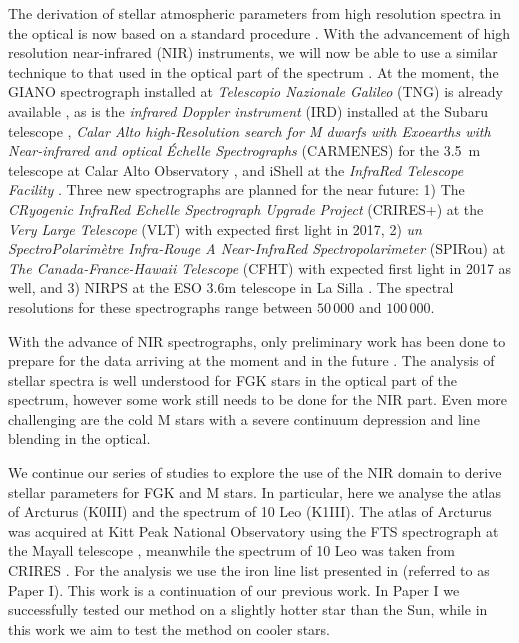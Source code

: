 \documentclass{aa}
\begin{document}
The derivation of stellar atmospheric parameters from high resolution spectra in
the optical is now based on a standard procedure
\citep[see e.g.][]{Valenti2005,Sousa2008a}. With the advancement of high
resolution near-infrared (NIR) instruments, we will now be able to use a similar
technique to that used in the optical part of the spectrum
\citep[see e.g.][]{Melendez1999,Sousa2008a,Tsantaki2013,Mucciarelli2013,Bensby2014}.
At the moment, the GIANO spectrograph installed at \emph{Telescopio Nazionale
Galileo} (TNG) is already available \citep{GIANO}, as is the \emph{infrared Doppler
instrument} (IRD) installed at the Subaru telescope \citep{IRD}, \emph{Calar
Alto high-Resolution search for M dwarfs with Exoearths with Near-infrared and
optical Échelle Spectrographs} (CARMENES) for the \SI{3.5}{m} telescope at Calar
Alto Observatory \citep{CARMENES}, and iShell at the \emph{InfraRed Telescope
Facility} \citep{ishell1,ishell2}. Three new spectrographs are
planned for the near future: 1) The \emph{CRyogenic InfraRed Echelle
Spectrograph Upgrade Project} (CRIRES+) at the \emph{Very Large Telescope} (VLT)
\citep{CRIRESp} with expected first light in 2017, 2) \emph{un
SpectroPolarimètre Infra-Rouge A Near-InfraRed Spectropolarimeter} (SPIRou) at
\emph{The Canada-France-Hawaii Telescope} (CFHT) \citep{SPIROU1,SPIROU2} with
expected first light in 2017 as well, and 3) NIRPS at the ESO 3.6m telescope in
La Silla \citep{NIRPS}. The spectral resolutions for these spectrographs range
between $50\,000$ and $100\,000$.

With the advance of NIR spectrographs, only preliminary work has been done to
prepare for the data arriving at the moment and in the future \citep[see
e.g.][]{Onehag2012,Lindgren2016,Andreasen2016}. The analysis of stellar spectra
is well understood for FGK stars in the optical part of the spectrum, however
some work still needs to be done for the NIR part. Even more challenging are the
cold M stars with a severe continuum depression and line blending in the
optical.

We continue our series of studies to explore the use of the NIR domain to derive
stellar parameters for FGK and M stars. In particular, here we analyse the atlas
of Arcturus (K0III) and the spectrum of 10 Leo (K1III). The atlas of Arcturus
was acquired at Kitt Peak National Observatory using the FTS spectrograph at the
Mayall telescope \citep{Hinkle2003}, meanwhile the spectrum of 10 Leo was taken
from CRIRES \citep{Nicholls2016}. For the analysis we use the iron line list
presented in \citet{Andreasen2016} (referred to as Paper I). This work is a
continuation of our previous work. In Paper I we successfully tested our method
on a slightly hotter star than the Sun, while in this work we aim to test the
method on cooler stars.
\end{document}
